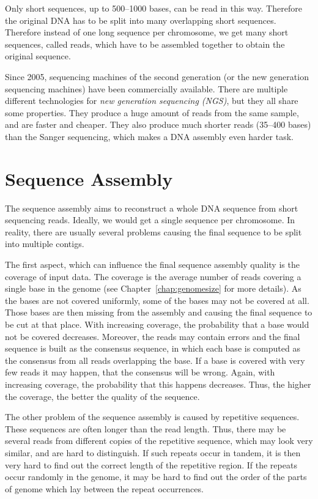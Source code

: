 Only short sequences, up to 500--1000 bases, can be read in this way. Therefore the original DNA has to be split into many overlapping short sequences.
Therefore instead of one long sequence per chromosome, we get many short sequences, called reads, which have to be assembled together to obtain the original sequence.

Since 2005, sequencing machines of the second generation (or the new generation sequencing machines) have been commercially available. There are multiple different technologies for \emph{new generation sequencing (NGS)}, but they all share some properties.
They produce a huge amount of reads from the same sample, and are faster and cheaper. They also produce much shorter reads (35--400 bases) than the Sanger sequencing, which makes a DNA assembly even harder task.


\section{Sequence Assembly}
\label{sect:dna-assembly}

The sequence assembly aims to reconstruct a whole DNA sequence from short sequencing reads. Ideally, we would get a single sequence per chromosome. In reality, there are usually several problems causing the final sequence to be split into multiple contigs.

The first aspect, which can influence the final sequence assembly quality is the coverage of input data. The coverage is the average number of reads covering a single base in the genome (see Chapter~\ref{chap:genomesize} for more details).
As the bases are not covered uniformly, some of the bases may not be covered at all. Those bases are then missing from the assembly and causing the final sequence to be cut at that place. With increasing coverage, the probability that a base would not be covered decreases.
Moreover, the reads may contain errors and the final sequence is built as the consensus sequence, in which each base is computed as the consensus from all reads overlapping the base. If a base is covered with very few reads it may happen, that the consensus will be wrong. Again, with increasing coverage, the probability that this happens decreases. Thus, the higher the coverage, the better the quality of the sequence.

The other problem of the sequence assembly is caused by repetitive sequences. These sequences are often longer than the read length. Thus, there may be several reads from different copies of the repetitive sequence, which may look very similar, and are hard to distinguish. If such repeats occur in tandem, it is then very hard to find out the correct length of the repetitive region. If the repeats occur randomly in the genome, it may be hard to find out the order of the parts of genome which lay between the repeat occurrences.

